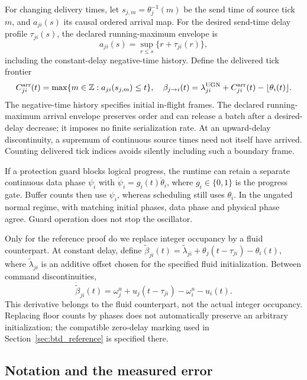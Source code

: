 For changing delivery times, let $s_{j,m}=\theta_j^{-1}(m)$ be the send
time of source tick $m$, and $a_{ji}(s)$ its causal ordered arrival map.
For the desired send-time delay profile $\tau_{ji}(s)$, the declared
running-maximum envelope is
\[
 a_{ji}(s)=\sup_{r\le s}\{r+\tau_{ji}(r)\},
\]
including the constant-delay negative-time history.
Define the delivered tick frontier
\begin{equation}
 C^{\rm arr}_{ji}(t)=\max\{m\in\mathbb Z:a_{ji}(s_{j,m})\le t\},
 \quad\beta_{j\to i}(t)=\lambda^{\rm UGN}_{ji}
       +C^{\rm arr}_{ji}(t)-\lfloor\theta_i(t)\rfloor.
 \label{eq:fpd_ordered_arrivals}
\end{equation}
The negative-time history specifies initial in-flight frames. The declared
running-maximum arrival envelope preserves order and can release a batch
after a desired-delay decrease; it imposes no finite serialization rate.
At an upward-delay discontinuity, a supremum of continuous source times
need not itself have arrived. Counting delivered tick indices avoids
silently including such a boundary frame.

If a protection guard blocks logical progress, the runtime can retain a
separate continuous data phase $\psi_i$ with
$\dot\psi_i=g_i(t)\dot\theta_i$, where $g_i\in\{0,1\}$ is the progress
gate. Buffer counts then use $\psi_i$, whereas scheduling still uses
$\theta_i$. In the ungated normal regime, with matching initial phases, data phase and physical phase agree. Guard operation does not stop the oscillator.

Only for the reference proof do we replace integer occupancy by a
fluid counterpart. At constant delay, define
$\widetilde\beta_{ji}(t)=\widetilde\lambda_{ji}
+\theta_j(t-\tau_{ji})-\theta_i(t)$, where
$\widetilde\lambda_{ji}$ is an additive offset chosen for the specified
fluid initialization. Between command discontinuities,
\begin{equation}
 \dot{\widetilde\beta}_{ji}(t)
 =\omega_j^u+u_j(t-\tau_{ji})-\omega_i^u-u_i(t).
 \label{eq:fpi_fluid_counterpart}
\end{equation}
This derivative belongs to the fluid counterpart, not the actual integer
occupancy. Replacing floor counts by phases does not automatically preserve
an arbitrary initialization; the compatible zero-delay marking used in
Section~\ref{sec:btd_reference} is specified there.

\subsection{Notation and the measured error}

